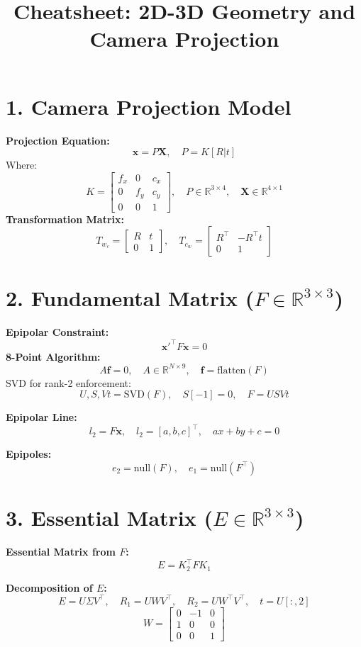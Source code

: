 \documentclass[a4paper,10pt]{article}
\title{Cheatsheet: 2D-3D Geometry and Camera Projection}
\author{}
\date{}
\begin{document}
\maketitle
\begin{multicols}{2}

\section*{1. Camera Projection Model}
\textbf{Projection Equation:}
\[
\mathbf{x} = P \mathbf{X}, \quad P = K [R | t]
\]
Where:
\[
K = \begin{bmatrix} f_x & 0 & c_x \\ 0 & f_y & c_y \\ 0 & 0 & 1 \end{bmatrix}, \quad P \in \mathbb{R}^{3 \times 4}, \quad \mathbf{X} \in \mathbb{R}^{4 \times 1}
\]
\textbf{Transformation Matrix:}
\[
T_{w_{c}} = \begin{bmatrix} R & t \\ 0 & 1 \end{bmatrix}, \quad T_{c_w} = \begin{bmatrix} R^\top & -R^\top t \\ 0 & 1 \end{bmatrix}
\]

\section*{2. Fundamental Matrix ($F \in \mathbb{R}^{3 \times 3}$)}
\textbf{Epipolar Constraint:}
\[
\mathbf{x'}^\top F \mathbf{x} = 0
\]
\textbf{8-Point Algorithm:}
\[
A \mathbf{f} = 0, \quad A \in \mathbb{R}^{N \times 9}, \quad \mathbf{f} = \text{flatten}(F)
\]
SVD for rank-2 enforcement:
\[
U, S, Vt = \text{SVD}(F), \quad S[-1] = 0, \quad F = U S Vt
\]

\textbf{Epipolar Line:}
\[
l_2 = F \mathbf{x}, \quad l_2 = [a, b, c]^\top, \quad ax + by + c = 0
\]

\textbf{Epipoles:}
\[
e_2 = \text{null}(F), \quad e_1 = \text{null}(F^\top)
\]

\section*{3. Essential Matrix ($E \in \mathbb{R}^{3 \times 3}$)}

\textbf{Essential Matrix from $F$:}
\[
E = K_2^\top F K_1
\]

\textbf{Decomposition of $E$:}
\[
E = U \Sigma V^\top, \quad R_1 = U W V^\top, \quad R_2 = U W^\top V^\top, \quad t = U[:, 2]
\]
\[
W = \begin{bmatrix} 0 & -1 & 0 \\ 1 & 0 & 0 \\ 0 & 0 & 1 \end{bmatrix}
\]


\end{multicols}
\end{document}

